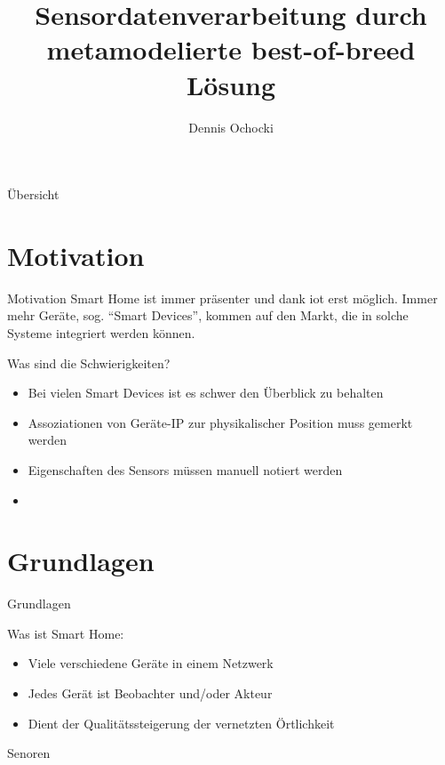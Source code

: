 \documentclass[12pt, pdf, xcolor={table, dvipsnames}, paperheight=8cm,paperwidth=12cm]{beamer}
\author{Dennis Ochocki}
\title[]{Sensordatenverarbeitung durch metamodelierte best-of-breed Lösung}
\begin{document}
	
\maketitle

\begin{frame}{Übersicht}
	\tableofcontents
\end{frame}

\section{Motivation}
\begin{frame}{Motivation}
	Smart Home ist immer präsenter und dank \gls{iot} erst möglich. Immer mehr Geräte, sog. \enquote{Smart Devices}, kommen auf den Markt, die in solche Systeme integriert werden können. 
	
	\begin{block}{Was sind die Schwierigkeiten?}
		\begin{itemize}
			\item Bei vielen Smart Devices ist es schwer den Überblick zu behalten
			\item Assoziationen von Geräte-IP zur physikalischer Position muss gemerkt werden
			\item Eigenschaften des Sensors müssen manuell notiert werden
			\item
		\end{itemize}
	\end{block}
\end{frame}


\section{Grundlagen}
\begin{frame}{Grundlagen}
	\begin{block}{Was ist Smart Home:}
		\begin{itemize}
			\item Viele verschiedene Geräte in einem Netzwerk
			\item Jedes Gerät ist Beobachter und/oder Akteur
			\item Dient der Qualitätssteigerung der vernetzten Örtlichkeit
		\end{itemize}
	\end{block}
\end{frame}

\begin{frame}{Senoren}
\end{frame}
\end{document}
